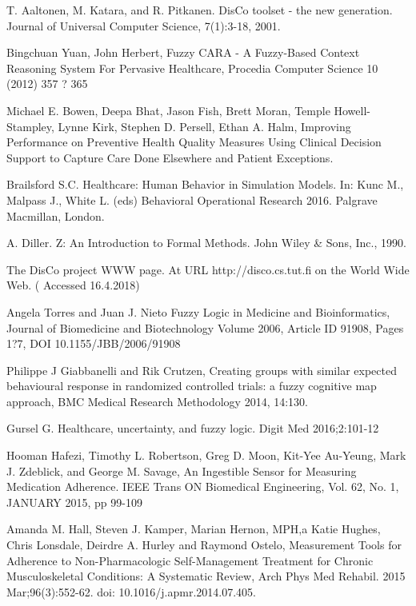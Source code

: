 \documentclass[graybox]{svmult}
\begin{document}
 
\begin{thebibliography}{99}

 T. Aaltonen, M. Katara, and R. Pitkanen. DisCo toolset - the new generation. Journal of Universal Computer Science, 7(1):3-18, 2001.

 Bingchuan Yuan, John Herbert, Fuzzy CARA - A Fuzzy-Based Context Reasoning System For Pervasive Healthcare,  Procedia Computer Science 10 (2012) 357 ? 365

 Michael E. Bowen, Deepa Bhat, Jason Fish, Brett Moran, Temple Howell-Stampley, Lynne Kirk, Stephen D. Persell, Ethan A. Halm, Improving Performance on Preventive Health Quality Measures Using Clinical Decision Support to Capture Care Done Elsewhere and Patient Exceptions.

 Brailsford S.C. Healthcare: Human Behavior in Simulation Models. In: Kunc M., Malpass J., White L. (eds) Behavioral Operational Research 2016. Palgrave Macmillan, London.

  A. Diller. Z: An Introduction to Formal Methods. John Wiley \& Sons, Inc., 1990.

 The DisCo project WWW page. At URL http://disco.cs.tut.fi on the World Wide Web. ( Accessed 16.4.2018)

 Angela Torres and Juan J. Nieto Fuzzy Logic in Medicine and Bioinformatics, Journal of Biomedicine and Biotechnology Volume 2006, Article ID 91908, Pages 1?7, DOI 10.1155/JBB/2006/91908

 Philippe J Giabbanelli and Rik Crutzen, Creating groups with similar expected behavioural response in randomized controlled trials: a fuzzy cognitive map approach, BMC Medical Research Methodology 2014, 14:130.

 Gursel G. Healthcare, uncertainty, and fuzzy logic. Digit Med 2016;2:101-12

 Hooman Hafezi, Timothy L. Robertson, Greg D. Moon, Kit-Yee Au-Yeung, Mark J. Zdeblick, and George M. Savage, An Ingestible Sensor for Measuring Medication Adherence. IEEE Trans ON Biomedical Engineering, Vol. 62, No. 1, JANUARY 2015, pp 99-109

 Amanda M. Hall, Steven J. Kamper, Marian Hernon, MPH,a Katie Hughes,  Chris Lonsdale, Deirdre A. Hurley and Raymond Ostelo, Measurement Tools for Adherence to Non-Pharmacologic Self-Management Treatment for Chronic Musculoskeletal Conditions: A Systematic Review, Arch Phys Med Rehabil. 2015 Mar;96(3):552-62. doi: 10.1016/j.apmr.2014.07.405.


\end{thebibliography}
\end{document}
